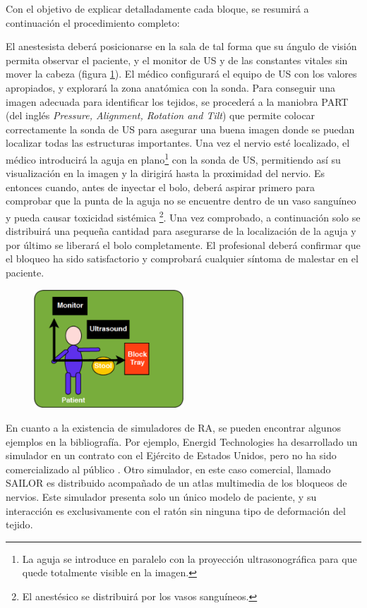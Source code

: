 Con el objetivo de explicar detalladamente cada bloque, se resumirá a continuación el procedimiento completo:

El anestesista deberá posicionarse en la sala de tal forma que su ángulo de visión permita observar el paciente, y el monitor de \ac{US} y de las constantes vitales sin mover la cabeza (figura \ref{fig:roomplace}). El médico configurará el equipo de \ac{US} con los valores apropiados, y explorará la zona anatómica con la sonda. Para conseguir una imagen adecuada para identificar los tejidos, se procederá a la maniobra PART (del inglés \emph{Pressure, Alignment, Rotation and Tilt}) que permite colocar correctamente la sonda de \ac{US} para asegurar una buena imagen donde se puedan localizar todas las estructuras importantes. Una vez el nervio esté localizado, el médico introducirá la aguja en plano\footnote{La aguja se introduce en paralelo con la proyección ultrasonográfica para que quede totalmente visible en la imagen.} con la sonda de \ac{US}, permitiendo así su visualización en la imagen y la dirigirá hasta la proximidad del nervio. Es entonces cuando, antes de inyectar el bolo, deberá aspirar primero para comprobar que la punta de la aguja no se encuentre dentro de un vaso sanguíneo y pueda causar toxicidad sistémica \footnote{El anestésico se distribuirá por los vasos sanguíneos.}. Una vez comprobado, a continuación solo se distribuirá una pequeña cantidad para asegurarse de la localización de la aguja y por último se liberará el bolo completamente. El profesional deberá confirmar que el bloqueo ha sido satisfactorio y comprobará cualquier síntoma de malestar en el paciente.


\begin{figure}[th]
   \centering
    \includegraphics[width=0.5\textwidth]{IMG/roomplacement.png}
    \caption{ }
   \label{fig:roomplace}
\end{figure}


En cuanto a la existencia de simuladores de \ac{RA}, se pueden encontrar algunos ejemplos en la bibliografía. Por ejemplo, Energid Technologies ha desarrollado  un simulador en un contrato con el Ejército de Estados Unidos, pero no ha sido comercializado al público \cite{lim2008simulation}.
Otro simulador, en este caso comercial, llamado SAILOR es distribuido acompañado de un atlas multimedia de los bloqueos de nervios. Este simulador presenta solo un único modelo de paciente, y su interacción es exclusivamente con el ratón sin ninguna tipo de deformación del tejido\cite{Bibin}. 

